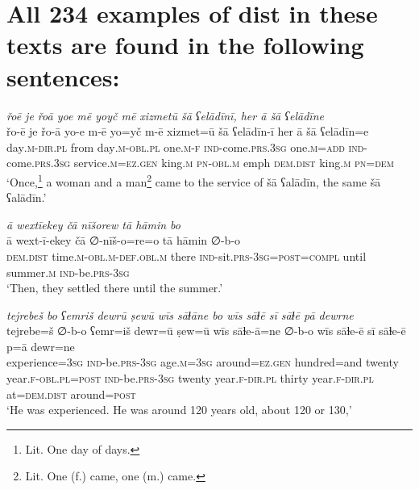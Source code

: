 \chapter{All 234 examples of dist in these texts are found in the following sentences:}

\ea \label{ZB.1}
\textit{řoē je řoā yoe mē yoyč mē xizmetū šā ʕelādīnī, her ā šā ʕelādīne} \\ 
\gll řo-ē je řo-ā yo-e m-ē yo=yč m-ē xizmet=ū šā ʕelādīn-ī her ā šā ʕelādīn=e \\ 
 day\textsc{.m}\textsc{-dir}\textsc{.pl} from day\textsc{.m}\textsc{-obl}\textsc{.pl} one\textsc{.m}\textsc{-f} \textsc{ind-}come\textsc{.prs}\textsc{.3sg} one\textsc{.m}\textsc{=add} \textsc{ind-}come\textsc{.prs}\textsc{.3sg} service\textsc{.m}\textsc{\textsc{=ez.gen}} king\textsc{.m} \textsc{pn}\textsc{-obl}\textsc{.m} emph \textsc{dem.dist} king\textsc{.m} \textsc{pn}\textsc{=dem} \\ 
\glt `Once,\footnote{Lit. One day of days.} a woman and a man\footnote{Lit. One (f.) came, one (m.) came.} came to the service of šā ʕalādīn, the same šā ʕalādīn.'
\z 
 
\ea \label{ZB.6}
\textit{ā wextīekey čā nīšorew tā hāmin bo} \\ 
\gll ā wext-ī-ekey čā ∅-nīš-o=re=o tā hāmin ∅-b-o \\ 
 \textsc{dem.dist} time\textsc{.m}\textsc{-obl}\textsc{.m}\textsc{-def}\textsc{.obl}\textsc{.m} there \textsc{ind-}sit\textsc{.prs}\textsc{-3sg}\textsc{=\textsc{post}}\textsc{=compl} until summer\textsc{.m} \textsc{ind-}be\textsc{.prs}\textsc{-3sg} \\ 
\glt `Then, they settled there until the summer.'
\z 
 
\ea \label{ZB.12}
\textit{tejrebeš bo ʕemriš dewrū ṣewū wīs sāɫāne bo wīs sāɫē sī sāɫē pā dewrne} \\ 
\gll tejrebe=š ∅-b-o ʕemr=iš dewr=ū ṣew=ū wīs sāɫe-ā=ne ∅-b-o wīs sāɫe-ē sī sāɫe-ē p=ā dewr=ne \\ 
 experience\textsc{=3sg} \textsc{ind-}be\textsc{.prs}\textsc{-3sg} age\textsc{.m}\textsc{=3sg} around\textsc{\textsc{=ez.gen}} hundred=and twenty year\textsc{.f}\textsc{-obl}\textsc{.pl}\textsc{=\textsc{post}} \textsc{ind-}be\textsc{.prs}\textsc{-3sg} twenty year\textsc{.f}\textsc{-dir}\textsc{.pl} thirty year\textsc{.f}\textsc{-dir}\textsc{.pl} at=\textsc{dem.dist} around\textsc{=\textsc{post}} \\ 
\glt `He was experienced. He was around 120 years old, about 120 or 130,'
\z 
 
